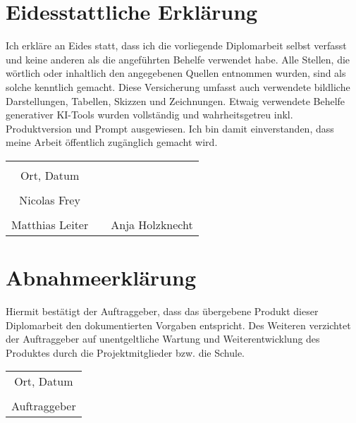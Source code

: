 \chapter*{Eidesstattliche Erklärung}
Ich erkläre an Eides statt, dass ich die vorliegende Diplomarbeit selbst verfasst und keine anderen als die angeführten Behelfe verwendet habe. Alle Stellen, die wörtlich oder inhaltlich den angegebenen Quellen entnommen wurden, sind als solche kenntlich gemacht. Diese Versicherung umfasst auch verwendete bildliche Darstellungen, Tabellen, Skizzen und Zeichnungen. Etwaig verwendete Behelfe generativer KI-Tools wurden vollständig und wahrheitsgetreu inkl. Produktversion und Prompt ausgewiesen. Ich bin damit einverstanden, dass meine Arbeit öffentlich zugänglich gemacht wird.

\vspace{1cm}
\begin{tabular}{c c c}
	                & \hspace{4cm} &                \\
	\cline{1-1}
	Ort, Datum      &              &                \\
	\vspace{2cm}
	                &              &                \\
	\cline{1-1}
	Nicolas Frey    &              & 				\\
	\vspace{2cm}
	                &              &                \\
	\cline{1-1}					   \cline{3-3}
	Matthias Leiter &              & Anja Holzknecht\\ 
\end{tabular}

\chapter*{Abnahmeerklärung}
Hiermit bestätigt der Auftraggeber, dass das übergebene Produkt dieser Diplomarbeit den dokumentierten Vorgaben entspricht. Des Weiteren verzichtet der Auftraggeber auf unentgeltliche Wartung und Weiterentwicklung des Produktes durch die Projektmitglieder bzw. die Schule.

\vspace{1cm}
\begin{tabular}{c}
	\\\cline{1-1}
	Ort, Datum \\
	\vspace{2cm}
	\\\cline{1-1}
	Auftraggeber
\end{tabular}


